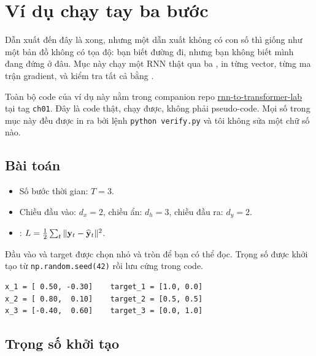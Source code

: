 %

\section{Ví dụ chạy tay ba bước}
\label{sec:ch01-vi-du}

Dẫn xuất đến đây là xong, nhưng một dẫn xuất không có con số thì giống như
một bản đồ không có tọa độ: bạn biết đường đi, nhưng bạn không biết mình đang
đứng ở đâu. Mục này chạy một RNN thật qua ba , in
từng vector, từng ma trận gradient, và kiểm tra tất cả bằng
.

Toàn bộ code của ví dụ này nằm trong companion repo
\href{https://github.com/Giang-Dang/rnn-to-transformer-lab}{rnn-to-transformer-lab}
tại tag \texttt{ch01}. Đây là code thật, chạy được, không phải pseudo-code.
Mọi số trong mục này đều được in ra bởi lệnh \texttt{python verify.py}
và tôi không sửa một chữ số nào.

\subsection{Bài toán}

\begin{itemize}
  \item Số bước thời gian: $T = 3$.
  \item Chiều đầu vào: $d_x = 2$, chiều ẩn: $d_h = 3$, chiều đầu ra: $d_y = 2$.
  \item {}: $L = \frac{1}{2}\sum_t \|\mathbf{y}_t - \widehat{\mathbf{y}}_t\|^2$.
\end{itemize}

Đầu vào và target được chọn nhỏ và tròn để bạn có thể đọc. Trọng số được khởi
tạo từ \texttt{np.random.seed(42)} rồi lưu cứng trong code.

\begin{verbatim}
x_1 = [ 0.50, -0.30]    target_1 = [1.0, 0.0]
x_2 = [ 0.80,  0.10]    target_2 = [0.5, 0.5]
x_3 = [-0.40,  0.60]    target_3 = [0.0, 1.0]
\end{verbatim}

\subsection{Trọng số khởi tạo}

